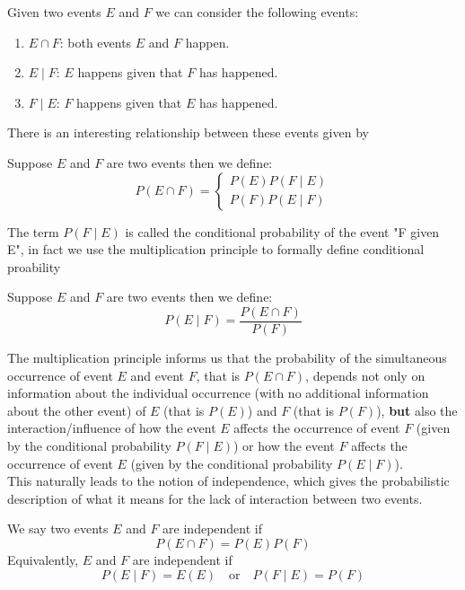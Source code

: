 Given two events $E$ and $F$ we can consider the following events:
\begin{enumerate}
    \item $E\cap F$: both events $E$ and $F$ happen. 
    \item $E\mid F$: $E$ happens given that $F$ has happened.
    \item $F\mid E$: $F$ happens given that $E$ has happened.
\end{enumerate}
There is an interesting relationship between these events given by 
\begin{defn}
    Suppose $E$ and $F$ are two events then we define:
    $$P(E\cap F) = \begin{cases} P(E)P(F\mid E) \\
    P(F)P(E\mid F)
    \end{cases}$$
\end{defn}
The term $P(F\mid E)$ is called the conditional probability of the event "F given E", in fact we use the multiplication principle to formally define conditional proability
\begin{defn}
    Suppose $E$ and $F$ are two events then we define:
    $$P(E\mid F) = \frac{P(E\cap F)}{P(F)} $$
\end{defn}

The multiplication principle informs us that the probability of the simultaneous occurrence of event $E$ and event $F$, that is $P(E\cap F)$, depends not only on information about the individual occurrence (with no additional information about the other event) of $E$ (that is $P(E)$) and $F$ (that is $P(F)$), \textbf{but} also the interaction/influence of how the event $E$ affects the occurrence of event $F$ (given by the conditional probability $P(F \mid E)$) or how the event $F$ affects the occurrence of event $E$ (given by the conditional probability $P(E \mid F)$).
\\

This naturally leads to the notion of independence, which gives the probabilistic description of what it means for the lack of interaction between two events. 
\\

\begin{defn}
    We say two events $E$ and $F$ are independent if $$P(E\cap F) = P(E) P(F)$$
    Equivalently, $E$ and $F$ are independent if
    $$ P(E\mid F) = E(E) \quad \text{or}\quad  P(F\mid E) = P(F)$$
\end{defn}

